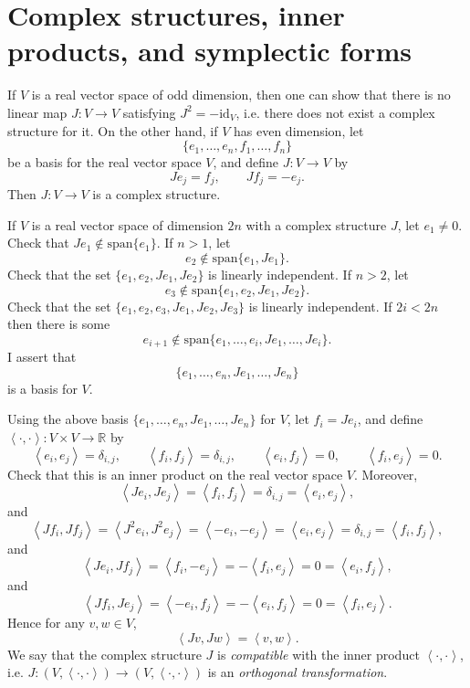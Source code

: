 \documentclass{article}
\newcommand{\inner}[2]{\left\langle #1, #2 \right\rangle}
\newcommand{\Span}{\textrm{span}}
\newcommand{\id}{\textrm{id}}
\begin{document}
\section{Complex structures, inner products, and symplectic forms}
If $V$ is a real vector space of odd dimension, then one can show that there is no linear map $J:V \to V$ satisfying $J^2=-\id_V$, i.e.
there does not exist a complex structure for it. On the other hand, if $V$ has even dimension,
let
\[
\{e_1,\ldots,e_n,f_1,\ldots,f_n\}
\]
be a basis for the real vector space $V$, and define $J:V \to V$ by
\[
Je_j = f_j, \qquad Jf_j=-e_j.
\]
Then $J:V \to V$ is a complex structure.

If $V$ is a real vector space of dimension $2n$ with a complex structure $J$, let $e_1 \neq 0$. Check that $J e_1 \not \in \Span\{e_1\}$. If $n > 1$, let
\[
e_2 \not \in \Span\{e_1,Je_1\}.
\]
Check that the set $\{e_1,e_2,Je_1,Je_2\}$ is linearly independent. If $n > 2$, let 
\[
e_3 \not \in \Span\{e_1,e_2,Je_1,Je_2\}.
\]
Check that the set $\{e_1,e_2,e_3,Je_1,Je_2,Je_3\}$ is linearly independent. If $2i<2n$ then there is some
\[
e_{i+1} \not \in \Span\{e_1,\ldots,e_i,Je_1,\ldots,Je_i\}.
\]
I assert that 
\[
\{e_1,\ldots,e_n,Je_1,\ldots,Je_n\}
\]
is a basis for $V$. 

Using the above basis $\{e_1,\ldots,e_n,Je_1,\ldots,Je_n\}$ for $V$, let $f_i=Je_i$, and define $\inner{\cdot}{\cdot}:V \times V \to \mathbb{R}$ by
\[
\inner{e_i}{e_j}=\delta_{i,j}, \qquad \inner{f_i}{f_j}=\delta_{i,j},\qquad \inner{e_i}{f_j}=0, \qquad
\inner{f_i}{e_j}=0.
\]
Check that this is an inner product on the real vector space $V$. Moreover, 
\[
\inner{Je_i}{Je_j}=\inner{f_i}{f_j}=\delta_{i,j}=\inner{e_i}{e_j},
\]
and
\[
\inner{Jf_i}{Jf_j}=\inner{J^2 e_i}{J^2 e_j}=\inner{-e_i}{-e_j}=\inner{e_i}{e_j}=\delta_{i,j}=\inner{f_i}{f_j},
\]
and
\[
\inner{Je_i}{Jf_j}=\inner{f_i}{-e_j}=-\inner{f_i}{e_j}=0=\inner{e_i}{f_j},
\]
and
\[
\inner{Jf_i}{Je_j}=\inner{-e_i}{f_j}=-\inner{e_i}{f_j}=0=\inner{f_i}{e_j}.
\]
Hence for any $v,w \in V$,
\[
\inner{Jv}{Jw}=\inner{v}{w}.
\]
We say that the complex structure $J$ is {\em compatible} with the inner product $\inner{\cdot}{\cdot}$, i.e.
$J:(V,\inner{\cdot}{\cdot}) \to (V,\inner{\cdot}{\cdot})$ is an {\em orthogonal transformation}.
\end{document}
